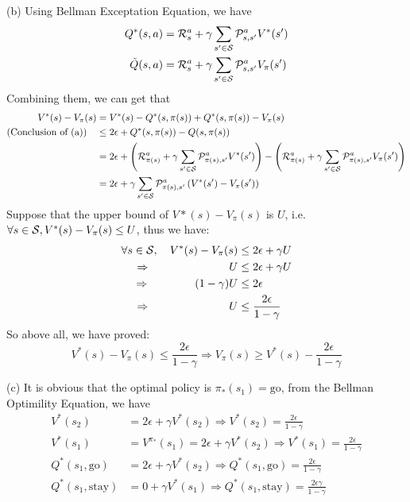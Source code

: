 \begin{homeworkProblem}
(b) Using Bellman Exceptation Equation, we have
\begin{align*}
Q^*(s, a) &= \mathcal{R}_s^{a} + \gamma\sum_{s'\in\mathcal{S}}\mathcal{P}_{s,s'}^aV^*(s') \\
\tilde{Q}(s, a) &= \mathcal{R}_s^{a} + \gamma\sum_{s'\in\mathcal{S}}\mathcal{P}_{s,s'}^aV_{\pi}(s')
\end{align*}
Combining them, we can get that
\begin{align*}
V^*(s) - V_{\pi}(s) &= V^*(s) - Q^*(s, \pi(s)) + Q^*(s, \pi(s)) - V_{\pi}(s) \\
\text{(Conclusion of (a))}\quad &\leq 2\epsilon + Q^*(s, \pi(s)) - Q(s, \pi(s)) \\
&= 2\epsilon + \left(\mathcal{R}_{\pi(s)}^{a} + \gamma\sum_{s'\in\mathcal{S}}\mathcal{P}_{\pi(s),s'}^aV^*(s')\right) - \left(\mathcal{R}_{\pi(s)}^{a} + \gamma\sum_{s'\in\mathcal{S}}\mathcal{P}_{\pi(s),s'}^aV_{\pi}(s')\right) \\
&= 2\epsilon + \gamma\sum_{s'\in\mathcal{S}}\mathcal{P}_{\pi(s),s'}^a\left(V^*(s') - V_{\pi}(s')\right)
\end{align*}
Suppose that the upper bound of $V*(s)-V_{\pi}(s)$ is $U$, i.e. $\forall s \in \mathcal{S}, V^*(s)-V_{\pi}(s) \leq U$, thus we have:
\begin{align*}
\forall s \in \mathcal{S},\quad V^*(s) - V_{\pi}(s) &\leq 2\epsilon + \gamma U \\
\Rightarrow \qquad\qquad\qquad\quad U &\leq 2\epsilon + \gamma U \\
\Rightarrow \qquad\qquad (1-\gamma)U &\leq 2\epsilon \\
\Rightarrow \qquad\qquad\qquad\quad U &\leq \dfrac{2\epsilon}{1-\gamma}
\end{align*}
So above all, we have proved:
$$V^*(s) - V_{\pi}(s)\leq \dfrac{2\epsilon}{1-\gamma} \Rightarrow V_{\pi}(s) \geq V^*(s) - \dfrac{2\epsilon}{1-\gamma}$$

(c) It is obvious that the optimal policy is $\pi_*(s_1)=\text{go}$, from the Bellman Optimility Equation, we have
\begin{align*}
V^*(s_2) &= 2\epsilon + \gamma V^*(s_2) \Rightarrow V^*(s_2) = \frac{2\epsilon}{1-\gamma} \\
V^*(s_1) &= V^{\pi_*}(s_1) = 2\epsilon + \gamma V^*(s_2) \Rightarrow V^*(s_1) = \frac{2\epsilon}{1-\gamma} \\
Q^*(s_1, \text{go}) &= 2\epsilon + \gamma V^*(s_2) \Rightarrow Q^*(s_1, \text{go}) = \frac{2\epsilon}{1-\gamma} \\
Q^*(s_1, \text{stay}) &= 0 + \gamma V^*(s_1) \Rightarrow Q^*(s_1, \text{stay}) = \frac{2\epsilon\gamma}{1-\gamma}
\end{align*}


\end{homeworkProblem}
